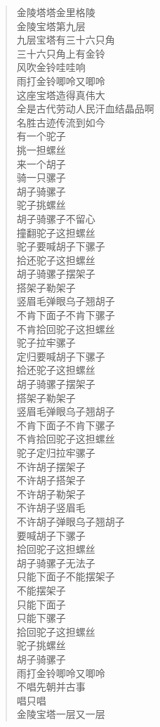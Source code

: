 \documentclass[UTF8]{ctexart}
\begin{document}
\begin{verse}
金陵塔塔金里格陵 \\
金陵宝塔第九层 \\
九层宝塔有三十六只角 \\
三十六只角上有金铃 \\
风吹金铃哇哇响 \\
雨打金铃唧呤又唧呤 \\
这座宝塔造得真伟大 \\
全是古代劳动人民汗血结晶品啊 \\
名胜古迹传流到如今 \\

有一个驼子 \\
挑一担螺丝 \\
来一个胡子 \\
骑一只骡子 \\
胡子骑骡子 \\
驼子挑螺丝 \\
胡子骑骡子不留心 \\
撞翻驼子这担螺丝 \\
驼子要喊胡子下骡子 \\
拾还驼子这担螺丝 \\
胡子骑骡子摆架子 \\
搭架子勒架子 \\
竖眉毛弹眼乌子翘胡子 \\
不肯下面子不肯下骡子 \\
不肯拾回驼子这担螺丝 \\
驼子拉牢骡子 \\
定归要喊胡子下骡子 \\
拾还驼子这担螺丝 \\
胡子骑骡子摆架子 \\
搭架子勒架子 \\
竖眉毛弹眼乌子翘胡子 \\
不肯下面子不肯下骡子 \\
不肯拾回驼子这担螺丝 \\
驼子定归拉牢骡子 \\
不许胡子摆架子 \\
不许胡子搭架子 \\
不许胡子勒架子 \\
不许胡子竖眉毛 \\
不许胡子弹眼乌子翘胡子 \\
要喊胡子下骡子 \\
拾回驼子这担螺丝 \\
胡子骑骡子无法子 \\
只能下面子不能摆架子 \\
不能摆架子 \\
只能下面子 \\
只能下骡子 \\
拾回驼子这担螺丝 \\
驼子挑螺丝 \\
胡子骑骡子 \\
雨打金铃唧呤又唧呤 \\

不唱先朝并古事 \\
唱只唱 \\
金陵宝塔一层又一层 \\


\end{verse}
\end{document}
